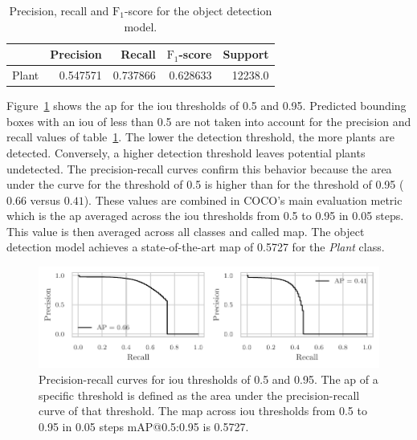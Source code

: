 \documentclass[draft,final]{vutinfth} %
\begin{document}
\begin{table}[h]
  \centering
  \begin{tabular}{lrrrr}
    \toprule
    {} &  Precision &    Recall &  $\mathrm{F}_1$-score &  Support \\
    \midrule
    Plant        &   0.547571 &  0.737866 &  0.628633 &  12238.0 \\
    \bottomrule
  \end{tabular}
  \caption{Precision, recall and $\mathrm{F}_1$-score for the object
    detection model.}
  \label{tab:yolo-metrics}
\end{table}

Figure~\ref{fig:yolo-ap} shows the \gls{ap} for the \gls{iou}
thresholds of 0.5 and 0.95. Predicted bounding boxes with an \gls{iou}
of less than 0.5 are not taken into account for the precision and
recall values of table~\ref{tab:yolo-metrics}. The lower the detection
threshold, the more plants are detected. Conversely, a higher
detection threshold leaves potential plants undetected. The
precision-recall curves confirm this behavior because the area under
the curve for the threshold of 0.5 is higher than for the threshold of
0.95 ($0.66$ versus $0.41$). These values are combined in COCO's
\cite{lin2015} main evaluation metric which is the \gls{ap} averaged
across the \gls{iou} thresholds from 0.5 to 0.95 in 0.05 steps. This
value is then averaged across all classes and called \gls{map}. The
object detection model achieves a state-of-the-art \gls{map} of 0.5727
for the \emph{Plant} class.

\begin{figure}
  \centering
  \includegraphics{graphics/APpt5-pt95.pdf}
  \caption[Object detection AP@0.5 and AP@0.95.]{Precision-recall
    curves for \gls{iou} thresholds of 0.5 and 0.95. The \gls{ap} of a
    specific threshold is defined as the area under the
    precision-recall curve of that threshold. The \gls{map} across
    \gls{iou} thresholds from 0.5 to 0.95 in 0.05 steps
    \textsf{mAP}@0.5:0.95 is 0.5727.}
  \label{fig:yolo-ap}
\end{figure}
\end{document}
